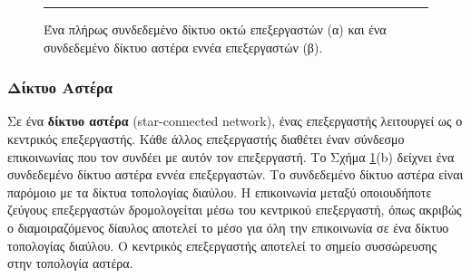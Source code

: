 \documentclass[12pt,a4paper]{article} %
\begin{document}
\begin{figure}[H]
\centering
{}
\noindent\rule{\textwidth}{0.2pt}
\caption{Ένα πλήρως συνδεδεμένο δίκτυο οκτώ επεξεργαστών (α) και ένα 
συνδεδεμένο δίκτυο αστέρα εννέα επεξεργαστών (β).}
\label{fig:graph41}
\end{figure}
\vspace{0.3cm}

\subsubsection*{Δίκτυο Αστέρα} 
Σε ένα \textbf{δίκτυο αστέρα} (star-connected network), 
ένας επεξεργαστής λειτουργεί ως ο κεντρικός επεξεργαστής. Κάθε άλλος 
επεξεργαστής διαθέτει έναν σύνδεσμο επικοινωνίας που τον συνδέει με αυτόν 
τον επεξεργαστή. Το Σχήμα \ref{fig:graph41}(b) δείχνει ένα συνδεδεμένο 
δίκτυο αστέρα εννέα επεξεργαστών. Το συνδεδεμένο δίκτυο αστέρα είναι 
παρόμοιο με τα δίκτυα τοπολογίας διαύλου. Η επικοινωνία μεταξύ οποιουδήποτε 
ζεύγους επεξεργαστών δρομολογείται μέσω του κεντρικού επεξεργαστή, όπως 
ακριβώς ο διαμοιραζόμενος δίαυλος αποτελεί το μέσο για όλη την επικοινωνία 
σε ένα δίκτυο τοπολογίας διαύλου. Ο κεντρικός επεξεργαστής αποτελεί το 
σημείο συσσώρευσης στην τοπολογία αστέρα.
\end{document}
